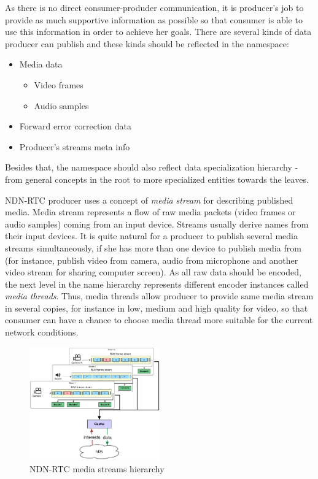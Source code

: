\documentclass[10pt]{proc}
\begin{document}
As there is no direct consumer-produder communication, it is producer's job to provide as much supportive information as possible so that consumer is able to use this information in order to achieve her goals. There are several kinds of data producer can publish and these kinds should be reflected in the namespace:

\begin{itemize}
\item Media data
\begin{itemize}
\item Video frames
\item Audio samples
\end{itemize}
\item Forward error correction data
\item Producer's streams meta info
\end{itemize}

Besides that, the namespace should also reflect data specialization hierarchy - from general concepts in the root to more specialized entities towards the leaves. 

NDN-RTC producer uses a concept of \textit{media stream} for describing published media. Media stream represents a flow of raw media packets (video frames or audio samples) coming from an input device. Streams usually derive names from their input devices. It is quite natural for a producer to publish several media streams simultaneously, if she has more than one device to publish media from (for instance, publish video from camera, audio from microphone and another video stream for sharing computer screen). As all raw data should be encoded, the next level in the name hierarchy represents different encoder instances called \textit{media threads}. Thus, media threads allow producer to provide same media stream in several copies, for instance in low, medium and high quality for video, so that consumer can have a chance to choose media thread more suitable for the current network conditions.

\begin{figure}[t!]
\centering
\includegraphics[width=0.5\textwidth]{streams-hierarchy}
\caption{NDN-RTC media streams hierarchy}
\label{fig:stream-hierarchy}
\end{figure}
\end{document}
